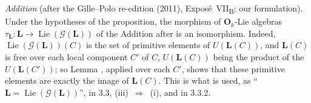 \par\medskip\noindent{}%
\emph{Addition} (after the Gille--Polo re-edition (2011),
Expos\'e~VII\textsubscript{B}; our formulation). Under the hypotheses of the
proposition, the morphism of \(\mathbf O_k\)-Lie algebras
\(\tau_{\mathbf L}\colon\mathbf L\to\operatorname{Lie}(\mathscr G(\mathbf L))\) of the
Addition after  is an isomorphism. Indeed,
\(\operatorname{Lie}(\mathscr G(\mathbf L))(C)\) is the set of primitive elements of
\(U(\mathbf L(C))\), and \(\mathbf L(C)\) is free over each local component
\(C'\) of \(C\), \(U(\mathbf L(C))\) being the product of the
\(U(\mathbf L(C'))\); so Lemma , applied over each \(C'\), shows that
these primitive elements are exactly the image of \(\mathbf L(C)\). This is
what is used, as ``\(\mathbf L=\operatorname{Lie}(\mathscr G(\mathbf L))\)'', in
3.3, (iii)~\(\Rightarrow\)~(i), and in 3.3.2.


